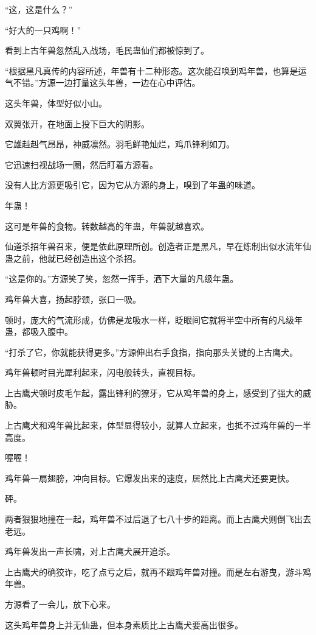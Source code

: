 
\begin{this_body}

“这，这是什么？”

“好大的一只鸡啊！”

看到上古年兽忽然乱入战场，毛民蛊仙们都被惊到了。

“根据黑凡真传的内容所述，年兽有十二种形态。这次能召唤到鸡年兽，也算是运气不错。”方源一边打量这头年兽，一边在心中评估。

这头年兽，体型好似小山。

双翼张开，在地面上投下巨大的阴影。

它雄赳赳气昂昂，神威凛然。羽毛鲜艳灿烂，鸡爪锋利如刀。

它迅速扫视战场一圈，然后盯着方源看。

没有人比方源更吸引它，因为它从方源的身上，嗅到了年蛊的味道。

年蛊！

这可是年兽的食物。转数越高的年蛊，年兽就越喜欢。

仙道杀招年兽召来，便是依此原理所创。创造者正是黑凡，早在炼制出似水流年仙蛊之前，他就已经创造出这个杀招。

“这是你的。”方源笑了笑，忽然一挥手，洒下大量的凡级年蛊。

鸡年兽大喜，扬起脖颈，张口一吸。

顿时，庞大的气流形成，仿佛是龙吸水一样，眨眼间它就将半空中所有的凡级年蛊，都吸入腹中。

“打杀了它，你就能获得更多。”方源伸出右手食指，指向那头关键的上古鹰犬。

鸡年兽顿时目光犀利起来，闪电般转头，直视目标。

上古鹰犬顿时皮毛乍起，露出锋利的獠牙，它从鸡年兽的身上，感受到了强大的威胁。

上古鹰犬和鸡年兽比起来，体型显得较小，就算人立起来，也抵不过鸡年兽的一半高度。

喔喔！

鸡年兽一扇翅膀，冲向目标。它爆发出来的速度，居然比上古鹰犬还要更快。

砰。

两者狠狠地撞在一起，鸡年兽不过后退了七八十步的距离。而上古鹰犬则倒飞出去老远。

鸡年兽发出一声长啸，对上古鹰犬展开追杀。

上古鹰犬的确狡诈，吃了点亏之后，就再不跟鸡年兽对撞。而是左右游曳，游斗鸡年兽。

方源看了一会儿，放下心来。

这头鸡年兽身上并无仙蛊，但本身素质比上古鹰犬要高出很多。


\end{this_body}
